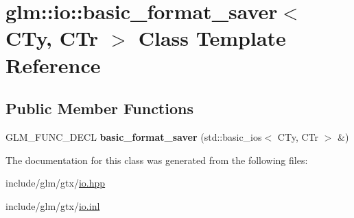 \hypertarget{classglm_1_1io_1_1basic__format__saver}{}\section{glm\+:\+:io\+:\+:basic\+\_\+format\+\_\+saver$<$ C\+Ty, C\+Tr $>$ Class Template Reference}
\label{classglm_1_1io_1_1basic__format__saver}
\subsection*{Public Member Functions}
\begin{DoxyCompactItemize}
\item 
\mbox{\label{classglm_1_1io_1_1basic__format__saver_a9688fa6dce0c32285527df2336ca9127}} 
G\+L\+M\+\_\+\+F\+U\+N\+C\+\_\+\+D\+E\+CL {\bfseries basic\+\_\+format\+\_\+saver} (std\+::basic\+\_\+ios$<$ C\+Ty, C\+Tr $>$ \&)
\end{DoxyCompactItemize}


The documentation for this class was generated from the following files\+:\begin{DoxyCompactItemize}
\item 
include/glm/gtx/\hyperlink{io_8hpp}{io.\+hpp}\item 
include/glm/gtx/\hyperlink{io_8inl}{io.\+inl}\end{DoxyCompactItemize}
